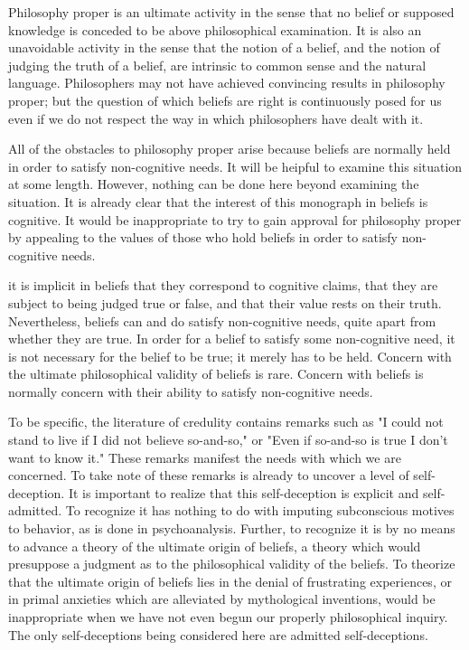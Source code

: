 \documentclass[10pt,twoside]{memoir}
\begin{document}
\begin{enumerate}
Philosophy proper is an ultimate activity in the sense that no belief or 
supposed knowledge is conceded to be above philosophical examination. It is 
also an unavoidable activity in the sense that the notion of a belief, and the 
notion of judging the truth of a belief, are intrinsic to common sense and the 
natural language. Philosophers may not have achieved convincing results in 
philosophy proper; but the question of which beliefs are right is 
continuously posed for us even if we do not respect the way in which 
philosophers have dealt with it. 

All of the obstacles to philosophy proper arise because beliefs are 
normally held in order to satisfy non-cognitive needs. It will be heipful to 
examine this situation at some length. However, nothing can be done here 
beyond examining the situation. It is already clear that the interest of this 
monograph in beliefs is cognitive. It would be inappropriate to try to gain 
approval for philosophy proper by appealing to the values of those who hold 
beliefs in order to satisfy non-cognitive needs. 

it is implicit in beliefs that they correspond to cognitive claims, that 
they are subject to being judged true or false, and that their value rests on 
their truth. Nevertheless, beliefs can and do satisfy non-cognitive needs, 
quite apart from whether they are true. In order for a belief to satisfy some 
non-cognitive need, it is not necessary for the belief to be true; it merely has 
to be held. Concern with the ultimate philosophical validity of beliefs is rare. 
Concern with beliefs is normally concern with their ability to satisfy 
non-cognitive needs. 

To be specific, the literature of credulity contains remarks such as "I
could not stand to live if I did not believe so-and-so," or "Even if so-and-so is 
true I don't want to know it." These remarks manifest the needs with which 
we are concerned. To take note of these remarks is already to uncover a level 
of self-deception. It is important to realize that this self-deception is explicit 
and self-admitted. To recognize it has nothing to do with imputing 
subconscious motives to behavior, as is done in psychoanalysis. Further, to 
recognize it is by no means to advance a theory of the ultimate origin of 
beliefs, a theory which would presuppose a judgment as to the philosophical 
validity of the beliefs. To theorize that the ultimate origin of beliefs lies in 
the denial of frustrating experiences, or in primal anxieties which are 
alleviated by mythological inventions, would be inappropriate when we have 
not even begun our properly philosophical inquiry. The only self-deceptions 
being considered here are admitted self-deceptions. 


\end{enumerate}
\end{document}
